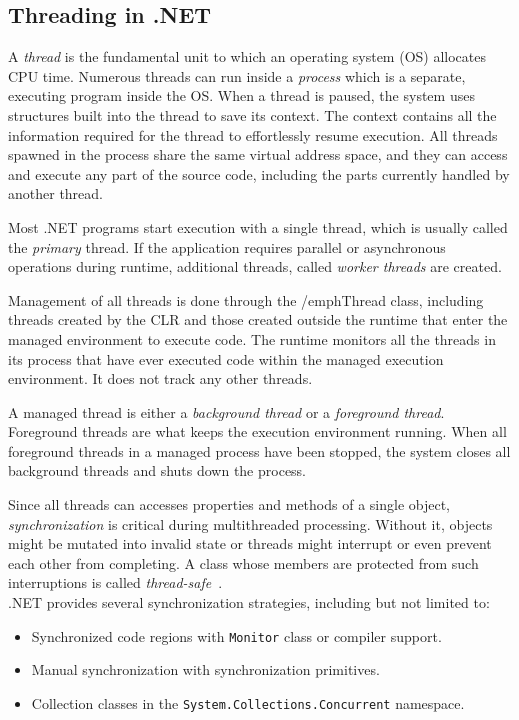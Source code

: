 \subsection{Threading in .NET}
A \emph{thread} is the fundamental unit to which an operating system (OS) allocates CPU time. Numerous threads can run inside a \emph{process} which is a separate, executing program inside the OS.
When a thread is paused, the system uses structures built into the thread to save its context. The context contains all the information required for the thread to effortlessly resume execution. All threads spawned in the process share the same virtual address space, and they can access and execute any part of the source code, including the parts currently handled by another thread.

Most .NET programs start execution with a single thread, which is usually called the \emph{primary} thread. If the application requires parallel or asynchronous operations during runtime, additional threads, called \emph{worker threads} are created.

Management of all threads is done through the /emph{Thread} class, including threads created by the CLR and those created outside the runtime that enter the managed environment to execute code. The runtime monitors all the threads in its process that have ever executed code within the managed execution environment. It does not track any other threads.
 
A managed thread is either a \emph{background thread} or a \emph{foreground thread}. Foreground threads are what keeps the execution environment running. When all foreground threads in a managed process have been stopped, the system closes all background threads and shuts down the process. 

Since all threads can accesses properties and methods of a single object, \emph{synchronization} is critical during multithreaded processing. Without it, objects might be mutated into invalid state or threads might interrupt or even prevent each other from completing. A class whose members are protected from such interruptions is called \emph{thread-safe}~\cite{ManagedThreading}.\\ 

.NET provides several synchronization strategies, including but not limited to:
\begin{itemize}
	\item Synchronized code regions with \texttt{Monitor} class or compiler support.
	\item Manual synchronization with synchronization primitives.
	\item Collection classes in the \texttt{System.Collections.Concurrent} namespace. 
\end{itemize}

